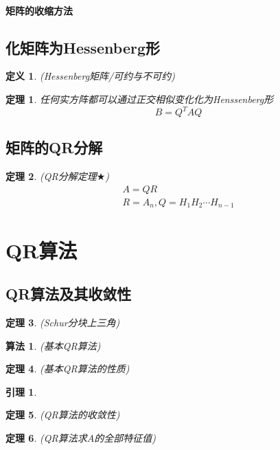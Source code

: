 \documentclass[twoside]{article}
\newtheorem{theorem}{定理}[section]
\newtheorem{algo}{算法}[section]
\newtheorem{lemma}{引理}[section]
\newtheorem{definition}{定义}[section]
\begin{document}
\paragraph{矩阵的收缩方法}
\subsection{化矩阵为Hessenberg形}
\begin{definition}
  (Hessenberg矩阵/可约与不可约)
\end{definition}
\begin{theorem}
  任何实方阵都可以通过正交相似变化化为Henssenberg形
  \begin{equation}
    B=Q^T AQ
  \end{equation}
\end{theorem}
\subsection{矩阵的QR分解}
\begin{theorem}
  (QR分解定理$\bigstar$)
  \begin{equation}
    \begin{aligned}
      A=QR \\
      R=A_n, Q=H_1 H_2 \cdots H_{n-1}
    \end{aligned}
  \end{equation}
\end{theorem}

\section{QR算法}
\subsection{QR算法及其收敛性}
\begin{theorem}
  (Schur分块上三角)
\end{theorem}
\begin{algo}
  (基本QR算法)
\end{algo}
\begin{theorem}
  (基本QR算法的性质)
\end{theorem}
\begin{lemma}
\end{lemma}
\begin{theorem}
  (QR算法的收敛性)
\end{theorem}
\begin{theorem}
  (QR算法求$A$的全部特征值)
\end{theorem}
\end{document}
